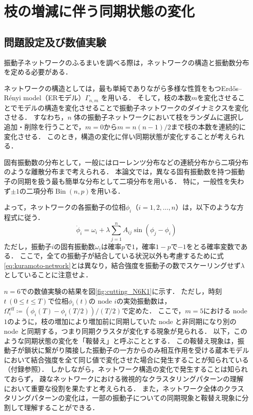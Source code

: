 \documentclass[../main]{subfiles}
\begin{document}
\chapter{枝の増減に伴う同期状態の変化}
\label{chap:method-3body}
\section{問題設定及び数値実験}
\label{sec:method-3body-settting}
振動子ネットワークのふるまいを調べる際は，ネットワークの構造と振動数分布を定める必要がある．

ネットワークの構造としては，最も単純でありながら多様な性質をもつErd\H{o}s–R\'{e}nyi model（ERモデル）$\Gamma_{n,m}$ を用いる．
そして，枝の本数$m$を変化させることでモデルの構造を変化させることで振動子ネットワークのダイナミクスを変化させる．
すなわち，$n$ 体の振動子ネットワークにおいて枝をランダムに選択し追加・削除を行うことで，$m=0$から$m=n(n-1)/2$まで枝の本数を連続的に変化させる．
このとき，構造の変化に伴い同期状態が変化することが考えられる．

固有振動数の分布として，一般にはローレンツ分布などの連続分布\cite{kuramoto1975}から二項分布のような離散分布\cite{1992BonillaNeuSpigler}まで考えられる．
本論文では，異なる固有振動数を持つ振動子の同期を扱う最も簡単な分布として二項分布を用いる．
特に，一般性を失わず$\pm 1$の二項分布$\operatorname{Bin}(n,p)$を用いる．

よって，ネットワークの各振動子の位相$\phi_i$（$i=1,2,\ldots,n$）は，以下のような方程式に従う．
\begin{equation}
    \dot{\phi}_i=\omega_i+\lambda\sum_{j=1}^n A_{ij}\sin(\phi_j-\phi_i)
\end{equation}
ただし，振動子$i$の固有振動数$\omega_i$は確率$p$で$1$，確率$1-p$で$-1$をとる確率変数である．
ここで，全ての振動子が結合している状況以外も考慮するために式\eqref{eq:kuramoto-network}とは異なり，結合強度を振動子の数でスケーリングせず$\lambda$としていることに注意せよ．

$n=6$での数値実験の結果を図\ref{fig:cutting_N6K1}に示す．
ただし，時刻$t\ (0\leq t\leq T)$で位相$\phi_i(t)$の node $i$の実効振動数は，$\Omega_i^{\mathrm{eff}}\coloneqq(\phi_i(T)-\phi_i(T/2))/(T/2)$で定めた．
ここで，$m=5$における node $1$のように，枝の増加により増加前に同期していた node と非同期になり別の node と同期する，つまり同期クラスタが変化する現象が見られる．
以下，このような同期状態の変化を「鞍替え」と呼ぶこととする．
この鞍替え現象は，振動子が鎖状に繋がり隣接した振動子の一方からのみ相互作用を受ける蔵本モデルにおいて結合強度を全て同じ値で変化させた場合に発生することが知られている\cite{XiaHuang:130506}（付録参照）．
しかしながら，ネットワーク構造の変化で発生することは知られておらず，
疎なネットワークにおける微視的なクラスタリングパターンの理解において重要な役割を果たすと考えられる．
また，ネットワーク全体のクラスタリングパターンの変化は，一部の振動子についての同期現象と鞍替え現象に分割して理解することができる．
\end{document}
